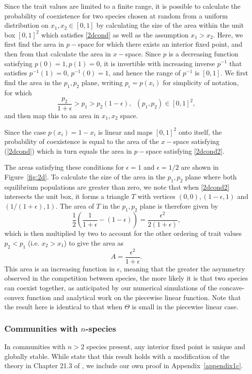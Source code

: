 Since the trait values are limited to a finite range, it is possible to calculate the probability of coexistence for two species chosen at random from a uniform distribution on $x_1,x_2 \in [0,1]$  by calculating the size of the area within the unit box $[0,1]^2$ which satisfies \eqref{2dcond} as well as the assumption $x_1>x_2$. Here, we first find the area in $p-$space for which there exists an interior fixed point, and then from that calculate the area in $x-$space. Since $p$ is a decreasing function satisfying $p(0)=1, p(1)=0$, it is invertible with increasing inverse $p^{-1}$ that satisfies $p^{-1}(1)=0, \, p^{-1}(0)=1$, and hence the range of $p^{-1}$ is $[0,1]$. We first find the area in the $p_1,p_2$ plane, writing $p_i=p(x_i)$ for simplicity of notation, for which
\begin{equation}
\label{2dcond2}
\frac{p_2}{1+\epsilon}>p_1>p_2(1-\epsilon),\;\; (p_1,p_2)\in [0,1]^2,
\end{equation}
and then map this to an area in $x_1,x_2$ space.


Since the case $p(x_i)=1-x_i$ is linear and maps $[0,1]^2$ onto itself, the probability of coexistence is equal to the area of the $x-$space satisfying (\ref{2dcond}) which in turn equals the area in $p-$space satisfying \eqref{2dcond2}.

The areas satisfying these conditions for $\epsilon=1$ and $\epsilon=1/2$ are shown in Figure~\ref{fig:2d}. To calculate the size of the area in the $p_1,p_2$ plane where both equilibrium populations are greater than zero, we note that when \eqref{2dcond2} intersects the unit box, it forms a triangle $T$ with vertices $(0,0),(1-\epsilon,1)$ and $(1/(1+\epsilon),1)$. The area of $T$ in the $p_1,p_2$ plane is therefore given by
\[
\frac{1}{2}\left(\frac{1}{1+\epsilon}-(1-\epsilon)\right)=\frac{\epsilon^2}{2(1+\epsilon)},
\]
which is then multiplied by two to account for the other ordering of trait values $p_2<p_1$ (i.e. $x_2>x_1$) to give the area as
\[
A =\frac{\epsilon^2}{1+\epsilon}.
\]
This area is an increasing function in $\epsilon$, meaning that the greater the asymmetry observed in the competition between species, the more likely it is that two species can coexist together, as anticipated by our numerical simulations of the concave-convex function and analytical work on the piecewise linear function. Note that the result here is identical to that when $\Theta$ is small in the piecewise linear case.

 
\subsubsection{Communities with $n$-species}
In communities with $n>2$ species present,  any interior fixed point is unique and globally stable. While  \cite{nowak1994superinfection} state that this result holds with a modification of the theory in Chapter 21.3 of \cite{hofbauer1998evolutionary}, we include our own proof in Appendix~\ref{appendix1c}. 

